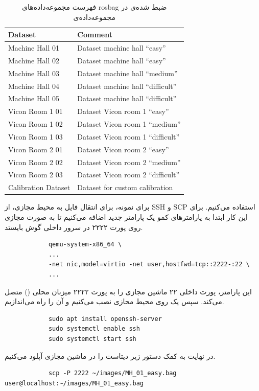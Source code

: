 \documentclass[11pt, a4paper]{article}
\begin{document}
	\begin{table}[h]
		\centering
		\begin{latin}
			\begin{tabular}{p{10em}p{20em}}
				\toprule
				Dataset & Comment \\
				\midrule
				Machine Hall 01 & Dataset machine hall “easy” \\
				Machine Hall 02 & Dataset machine hall “easy” \\
				Machine Hall 03 & Dataset machine hall “medium” \\
				Machine Hall 04 & Dataset machine hall “difficult” \\
				Machine Hall 05 & Dataset machine hall “difficult” \\
				Vicon Room 1 01 & Dataset Vicon room 1 “easy” \\
				Vicon Room 1 02 & Dataset Vicon room 1 “medium” \\
				Vicon Room 1 03 & Dataset Vicon room 1 “difficult” \\
				Vicon Room 2 01 & Dataset Vicon room 2 “easy” \\
				Vicon Room 2 02 & Dataset Vicon room 2 “medium” \\
				Vicon Room 2 03 & Dataset Vicon room 2 “difficult” \\
				Calibration Dataset & Dataset for custom calibration \\
				\bottomrule
			\end{tabular}
			
		\end{latin}
		\caption[فهرست مجموعه‌داده‌های]{فهرست مجموعه‌داده‌های  
			rosbag ضبط شده‌ی در مجموعه‌داده‌ی
			}
	\end{table}
	برای نمونه،  برای انتقال فایل
	 به محیط مجازی،
	از 
	\gls{SSH} و \gls{SCP} استفاده می‌کنیم.
	برای این کار ابتدا به پارامترهای کمو یک پارامتر جدید اضافه می‌کنیم تا به صورت مجازی روی پورت ۲۲۲۲ در سرور داخلی گوش بایستد.
	‍‍\begin{LTR}
		\begin{verbatim}
			qemu-system-x86_64 \
			...
			-net nic,model=virtio -net user,hostfwd=tcp::2222-:22 \
			...
		\end{verbatim}
	\end{LTR}
	این پارامتر، پورت داخلی ۲۲ ماشین مجازی را به پورت ۲۲۲۲ میزبان محلی 
	() متصل می‌کند.
	سپس یک  
	 روی محیط محازی نصب می‌کنیم و آن را راه می‌اندازیم.
	\begin{LTR}
		\begin{verbatim}
			sudo apt install openssh-server
			sudo systemctl enable ssh
			sudo systemctl start ssh
		\end{verbatim}
	\end{LTR}
	در نهایت به کمک دستور زیر دیتاست را در ماشین مجازی آپلود می‌کنیم.
	\begin{LTR}
		\begin{verbatim}
			scp -P 2222 ~/images/MH_01_easy.bag user@localhost:~/images/MH_01_easy.bag
		\end{verbatim}
	\end{LTR}
	
\end{document}
